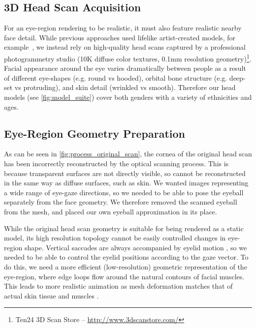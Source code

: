 \subsection{3D Head Scan Acquisition}
\label{sec:eye_region_geom_prep}

For an eye-region rendering to be realistic, it must also feature realistic nearby face detail.
While previous approaches used lifelike artist-created models, for example~\cite{swirski2014rendering}, we instead rely on high-quality head scans captured by a professional photogrammetry studio (10K diffuse color textures, 0.1mm resolution geometry)\footnote{Ten24 3D Scan Store -- \url{http://www.3dscanstore.com/}}.
Facial appearance around the eye varies dramatically between people as a result of different eye-shapes (e.g. round vs hooded), orbital bone structure (e.g. deep-set vs protruding), and skin detail (wrinkled vs smooth). Therefore our head models (see \autoref{fig:model_suite}) cover both genders with a variety of ethnicities and ages.

\subsection{Eye-Region Geometry Preparation}

As can be seen in \autoref{fig:process_original_scan}, the cornea of the original head scan has been incorrectly reconstructed by the optical scanning process.
This is because transparent surfaces are not directly visible, so cannot be reconstructed in the same way as diffuse surfaces, such as skin.
We wanted images representing a wide range of eye-gaze directions, so we needed to be able to pose the eyeball separately from the face geometry.
We therefore removed the scanned eyeball from the mesh, and placed our own eyeball approximation in its place.

While the original head scan geometry is suitable for being rendered as a static model, its high resolution topology cannot be easily controlled changes in eye-region shape.
Vertical saccades are always accompanied by eyelid motion \cite{liversedge2011oxford}, so we needed to be able to control the eyelid positions according to the gaze vector.
To do this, we need a more efficient (low-resolution) geometric representation of the eye-region, where edge loops flow around the natural contours of facial muscles.
This leads to more realistic animation as mesh deformation matches that of actual skin tissue and muscles \cite{orvalho2012facial}.

